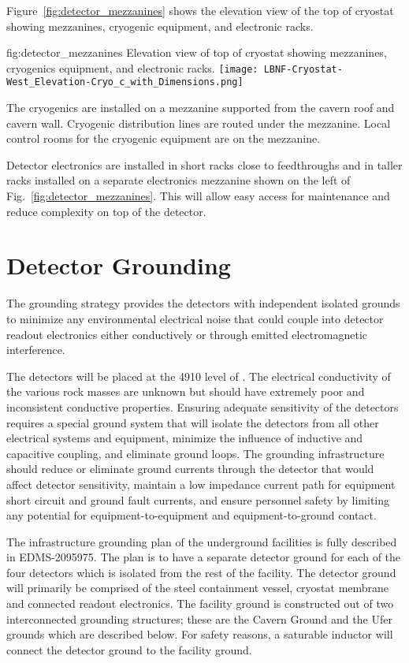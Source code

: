 Figure~\ref{fig:detector_mezzanines} shows the elevation view of the
top of cryostat showing mezzanines, cryogenic equipment, and
electronic racks.
\begin{dunefigure}{fig:detector_mezzanines}
  {Elevation view of top of cryostat showing mezzanines, cryogenics
    equipment, and electronic racks.}
  \texttt{[image: LBNF-Cryostat-West\_Elevation-Cryo\_c\_with\_Dimensions.png]}
\end{dunefigure}
The cryogenics are installed on a mezzanine supported from
the cavern roof and cavern wall. Cryogenic distribution lines are
routed under the mezzanine. Local control rooms for the
cryogenic equipment are on the mezzanine.

Detector electronics are installed in short racks close to
feedthroughs and in taller racks installed on a separate electronics
mezzanine shown on the left of Fig.~\ref{fig:detector_mezzanines}.
This will allow easy access for maintenance and reduce complexity on
top of the detector.

\section{Detector Grounding}
\label{sec:fdsp-coord-faci-grounding}


The grounding strategy provides the detectors with independent
isolated grounds to minimize any environmental electrical noise that
could couple into detector readout electronics either conductively or
through emitted electromagnetic interference.

The detectors will be placed at the 4910 level of \surf. The
electrical conductivity of the various rock masses are unknown but
should have extremely poor and inconsistent conductive
properties. Ensuring adequate sensitivity of the detectors requires a
special ground system that will isolate the detectors from all other
electrical systems and equipment, minimize the influence of inductive
and capacitive coupling, and eliminate ground loops. The grounding
infrastructure should reduce or eliminate ground currents through the
detector that would affect detector sensitivity, maintain a low
impedance current path for equipment short circuit and ground fault
currents, and ensure personnel safety by limiting any potential for
equipment-to-equipment and equipment-to-ground contact.

The infrastructure grounding plan of the underground facilities is
fully described in EDMS-2095975\cite{bib:cernedms2095975}.  The plan is to have a separate
detector ground for each of the four detectors which is isolated from
the rest of the facility.  The detector ground will primarily be
comprised of the steel containment vessel, cryostat membrane and
connected readout electronics.  The facility ground is constructed out
of two interconnected grounding structures; these are the Cavern
Ground and the Ufer grounds which are described below.  For safety
reasons, a saturable inductor will connect the detector ground to the
facility ground.

